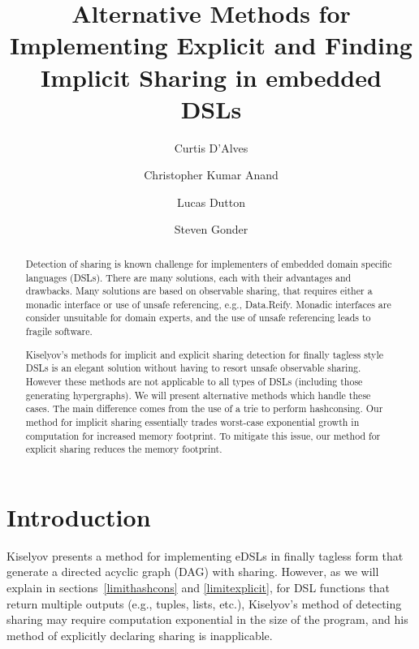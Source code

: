 \documentclass[runningheads]{llncs}
\begin{document}
\lstset{language=haskell}
%
\title{Alternative Methods for Implementing
    Explicit and Finding Implicit Sharing in embedded DSLs}
%
%
\author{Curtis D'Alves \and
Christopher Kumar Anand \and
Lucas Dutton \and
Steven Gonder
}
%
%
%
\maketitle              %
%
\begin{abstract}
  Detection of sharing is known challenge for implementers of embedded domain
  specific languages (DSLs). There are many solutions, each with their
  advantages and drawbacks. Many solutions are based on observable sharing, that
  requires either a monadic interface or use of unsafe referencing, e.g.,
  Data.Reify. Monadic interfaces are consider unsuitable for domain experts, and
  the use of unsafe referencing leads to fragile software.

  Kiselyov's methods for implicit and explicit sharing detection for finally
  tagless style DSLs is an elegant solution without having to resort unsafe
  observable sharing. However these methods are not applicable to all types of
  DSLs (including those generating hypergraphs). We will present alternative
  methods which handle these cases. The main difference comes from the use of a
  trie to perform hashconsing. Our method for implicit sharing essentially
  trades worst-case exponential growth in computation for increased memory
  footprint. To mitigate this issue, our method for explicit sharing reduces the
  memory footprint.

\end{abstract}
%
%
%
\section{Introduction}

Kiselyov \cite{kiselyov:sharing}  presents a method for implementing
eDSLs in finally tagless form that generate a directed acyclic graph (DAG) with
sharing. 
However, as we will explain in sections~\ref{limithashcons} and
\ref{limitexplicit}, for DSL functions that return multiple
outputs (e.g., tuples, lists, etc.), Kiselyov's method of detecting sharing may require computation exponential in the size of the program,
and his method of explicitly declaring sharing is inapplicable.
\end{document}
